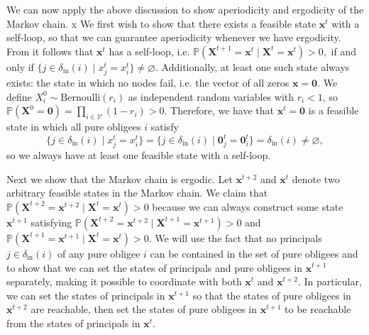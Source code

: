 \documentclass[mnsc,nonblindrev]{informs3}
\renewcommand{\Pr}{\mathbb{P}}
\newcommand{\din}{\delta_{\text{in}}}
\newcommand{\Xvec}{\mathbf{X}}
\newcommand{\xvec}{\mathbf{x}}
\renewenvironment{proof}[1][Proof]{%
  \par\noindent{\itshape #1.} \ignorespaces
}{%
  \hfill\Halmos\par
}
\begin{document}
\begin{APPENDICES}
\begin{proof}
    {We can now apply the above discussion to show aperiodicity and ergodicity of the Markov chain.}
x    
    We first wish to show that there exists a feasible state $\xvec^t$ with a self-loop, so that we can guarantee aperiodicity whenever we have ergodicity.
    From  it follows that $\xvec^t$ has a self-loop, i.e.
    \(
        \Pr(\Xvec^{t+1}=\xvec^t \mid \Xvec^t=\xvec^t) > 0,
    \)
    if and only if
    \(
        \{ j \in\din(i) \mid x^t_j=x^t_i \}\neq\varnothing.
    \)
    Additionally, at least one such state always exists: the state in which no nodes fail, i.e. the vector of all zeros $\xvec=\mathbf{0}$.  We define $X^0_i \sim \text{Bernoulli}(r_i)$ as independent random variables with $r_i<1$, so
    \(
        \Pr(\Xvec^0=\mathbf{0}) = \prod_{i\in\mathcal{V}} (1-r_i) > 0.
    \)
    Therefore, we have that $\xvec^t=\mathbf{0}$ is a feasible state in which all pure obligees $i$ satisfy
    \[
        \{j\in\din(i) \mid x_j^t=x_i^t\}
        = \{j\in\din(i) \mid \mathbf{0}_j^t=\mathbf{0}_i^t\}
        =\din(i)\neq\varnothing,
    \]
    so we always have at least one feasible state with a self-loop.

    Next we show that the Markov chain is ergodic.  Let $\xvec^{t+2}$ and $\xvec^{t}$ denote two arbitrary feasible states in the Markov chain.  We claim that $\Pr(\Xvec^{t+2} = \xvec^{t+2} \mid \Xvec^t = \xvec^t) > 0$ because we can always construct some state $\xvec^{t+1}$ satisfying $\Pr(\Xvec^{t+2} = \xvec^{t+2} \mid \Xvec^{t+1} = \xvec^{t+1}) > 0$ and $\Pr(\Xvec^{t+1} = \xvec^{t+1} \mid \Xvec^{t} = \xvec^{t}) > 0$.
    We will use the fact that no principals $j\in\din(i)$ of any pure obligee $i$ can be contained in the set of pure obligees and  to show that we can set the states of principals and pure obligees in $\xvec^{t+1}$ separately, making it possible to coordinate with both $\xvec^t$ and $\xvec^{t+2}$.  In particular, we can set the states of principals in $\xvec^{t+1}$ so that the states of pure obligees in $\xvec^{t+2}$ are reachable, then set the states of pure obligees in $\xvec^{t+1}$ to be reachable from the states of principals in $\xvec^t$.
    

\end{proof}
\end{APPENDICES}
\end{document}
